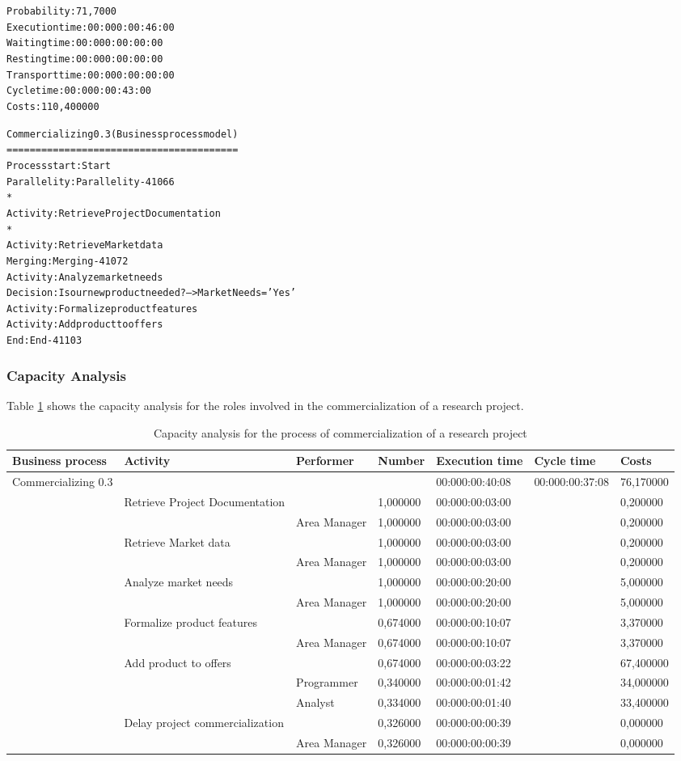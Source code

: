 \begin{alltt}
Probability:   71,7000%
Execution time:  00:000:00:46:00
Waiting time:  00:000:00:00:00
Resting time:  00:000:00:00:00
Transport time:  00:000:00:00:00
Cycle time:  00:000:00:43:00
Costs:  110,400000

Commercializing 0.3 (Business process model)
========================================
Process start: Start
Parallelity: Parallelity-41066
    *
    Activity: Retrieve Project Documentation
    *
    Activity: Retrieve Market data
Merging: Merging-41072
Activity: Analyze market needs
Decision: Is our new product needed? --> MarketNeeds = 'Yes'
Activity: Formalize product features
Activity: Add product to offers
End: End-41103
\end{alltt}



\subsubsection{Capacity Analysis}
Table \ref{2tab:commerc} shows the capacity analysis for the roles involved in
the commercialization of a research project.
\begin{landscape}
\centering
\begin{table}
{\tiny
\begin{tabular}{|l|l|l|l|l|l|l|}
Business process&Activity&Performer&Number&Execution time&Cycle
time&Costs\\
\hline
Commercializing 0.3&&&&00:000:00:40:08&00:000:00:37:08&76,170000\\
\hline
&Retrieve Project Documentation &&1,000000&00:000:00:03:00&&0,200000\\
\hline
&&Area Manager &1,000000&00:000:00:03:00&&0,200000\\
\hline
&Retrieve Market data &&1,000000&00:000:00:03:00&&0,200000\\
\hline
&&Area Manager &1,000000&00:000:00:03:00&&0,200000\\
\hline
&Analyze market needs &&1,000000&00:000:00:20:00&&5,000000\\
\hline
&&Area Manager &1,000000&00:000:00:20:00&&5,000000\\
\hline
&Formalize product features &&0,674000&00:000:00:10:07&&3,370000\\
\hline
&&Area Manager &0,674000&00:000:00:10:07&&3,370000\\
\hline
&Add product to offers &&0,674000&00:000:00:03:22&&67,400000\\
\hline
&&Programmer &0,340000&00:000:00:01:42&&34,000000\\
\hline
&&Analyst &0,334000&00:000:00:01:40&&33,400000\\
\hline
&Delay project commercialization &&0,326000&00:000:00:00:39&&0,000000\\
\hline
&&Area Manager &0,326000&00:000:00:00:39&&0,000000\\
\hline
\end{tabular}
}
\caption{Capacity analysis for the process of commercialization of a
research project}
\label{2tab:commerc}
\end{table}
\end{landscape}



